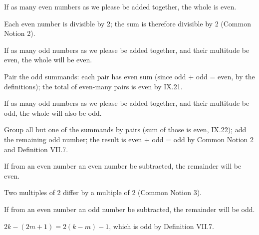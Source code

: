 \begin{claim}
\label{prop:IX.21}
If as many even numbers as we please be added together, the whole is
even.
\end{claim}
\begin{evidence}[Proof of IX.21]
\label{ev:IX.21}
Each even number is divisible by 2; the sum is therefore divisible
by 2 (Common Notion 2).
\end{evidence}

\begin{claim}
\label{prop:IX.22}
If as many odd numbers as we please be added together, and their
multitude be even, the whole will be even.
\end{claim}
\begin{evidence}[Proof of IX.22]
\label{ev:IX.22}
Pair the odd summands: each pair has even sum (since odd + odd =
even, by the definitions); the total of even-many pairs is even by
IX.21.
\end{evidence}

\begin{claim}
\label{prop:IX.23}
If as many odd numbers as we please be added together, and their
multitude be odd, the whole will also be odd.
\end{claim}
\begin{evidence}[Proof of IX.23]
\label{ev:IX.23}
Group all but one of the summands by pairs (sum of those is even,
IX.22); add the remaining odd number; the result is even + odd =
odd by Common Notion 2 and Definition VII.7.
\end{evidence}

\begin{claim}
\label{prop:IX.24}
If from an even number an even number be subtracted, the remainder
will be even.
\end{claim}
\begin{evidence}[Proof of IX.24]
\label{ev:IX.24}
Two multiples of 2 differ by a multiple of 2 (Common Notion 3).
\end{evidence}

\begin{claim}
\label{prop:IX.25}
If from an even number an odd number be subtracted, the remainder
will be odd.
\end{claim}
\begin{evidence}[Proof of IX.25]
\label{ev:IX.25}
$2k - (2m+1) = 2(k-m) - 1$, which is odd by Definition VII.7.
\end{evidence}

